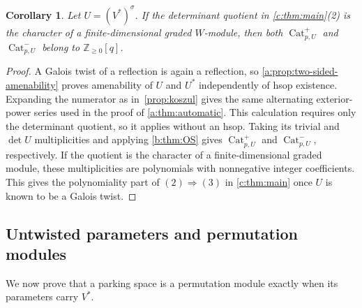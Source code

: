\documentclass[10pt,a4paper]{amsart}
\DeclareMathOperator{\Cat}{Cat}
\newtheorem{corollary}[theorem]{Corollary}
\theoremstyle{definition}
\newcommand{\Z}{\mathbb Z}\newcommand{\N}{\mathbb Z_{\ge0}}
\begin{document}
\begin{corollary}\label{cor:formal-products}
Let $U=(V^*)^\sigma$. If the determinant quotient in
\cref{c:thm:main}(2) is the character of a finite-dimensional graded
$W$-module, then both $\Cat^+_{p,U}$ and $\Cat^-_{p,U}$ belong to
$\Z_{\geq0}[q]$.
\end{corollary}
\begin{proof}
A Galois twist of a reflection is again a reflection, so
\cref{a:prop:two-sided-amenability} proves amenability of $U$ and
$U^*$ independently of hsop existence. Expanding the numerator as
in~\cref{prop:koszul} gives the same alternating exterior-power series
used in the proof of \cref{a:thm:automatic}. This calculation requires
only the determinant quotient, so it applies without an hsop.
Taking its trivial and $\det U$ multiplicities and applying
\cref{b:thm:OS} gives $\Cat^+_{p,U}$ and $\Cat^-_{p,U}$, respectively.
If the quotient is the character of a finite-dimensional graded module,
these multiplicities are polynomials with nonnegative integer
coefficients. This gives the polynomiality part of $(2)\Rightarrow(3)$
in \cref{c:thm:main} once $U$ is known to be a Galois twist.
\end{proof}

\subsection{Untwisted parameters and permutation modules}\label{sec:permutation}

We now prove that a parking space is a permutation module exactly
when its parameters carry $V^*$. %
\end{document}
